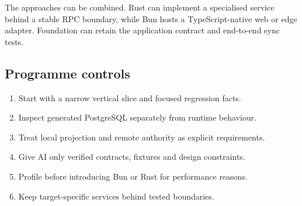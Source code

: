 \documentclass[10pt]{article}
\begin{document}
The approaches can be combined. Rust can implement a specialised service behind a stable RPC boundary, while Bun hosts a TypeScript-native web or edge adapter. Foundation can retain the application contract and end-to-end sync tests.

\subsection{Programme controls}

\begin{enumerate}
  \item Start with a narrow vertical slice and focused regression facts.
  \item Inspect generated PostgreSQL separately from runtime behaviour.
  \item Treat local projection and remote authority as explicit requirements.
  \item Give AI only verified contracts, fixtures and design constraints.
  \item Profile before introducing Bun or Rust for performance reasons.
  \item Keep target-specific services behind tested boundaries.
\end{enumerate}

\end{document}
